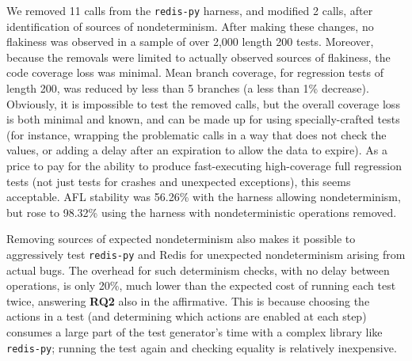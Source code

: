 We removed 11 calls from the {\tt redis-py} harness, and  modified 2
calls, after
identification of sources of nondeterminism.  After making these changes, no flakiness was observed in a sample of over 2,000 length
200 tests.   Moreover, because the removals were limited to actually
observed sources of flakiness, the code coverage loss was minimal.
Mean branch coverage, for regression tests of length 200, was reduced
by less than 5 branches (a less than 1\% decrease).  Obviously, it is
impossible to test the removed calls, but the overall coverage loss is
both minimal and known, and can be made up for using specially-crafted
tests (for instance, wrapping the problematic calls in a way that does
not check the values, or adding a delay after an expiration to allow
the data to expire).  As a price to pay for the ability to produce
fast-executing high-coverage full regression tests (not just tests for
crashes and unexpected exceptions), this seems acceptable.  AFL stability was 56.26\% with the harness allowing 
nondeterminism, but rose to 98.32\% using the harness with 
nondeterministic operations removed.

Removing sources of expected nondeterminism also makes
it possible to aggressively test {\tt redis-py} and Redis for
unexpected nondeterminism arising from actual bugs.  The overhead for such
determinism checks, with no delay between operations, is only
20\%, much lower than the expected cost of running each test twice,
answering {\bf RQ2} also in the affirmative.  This is because choosing the actions in a test (and determining which
actions are enabled at each step) consumes a large part of the test
generator's time with a complex library like {\tt redis-py}; running the test again and checking equality is
relatively inexpensive.   

